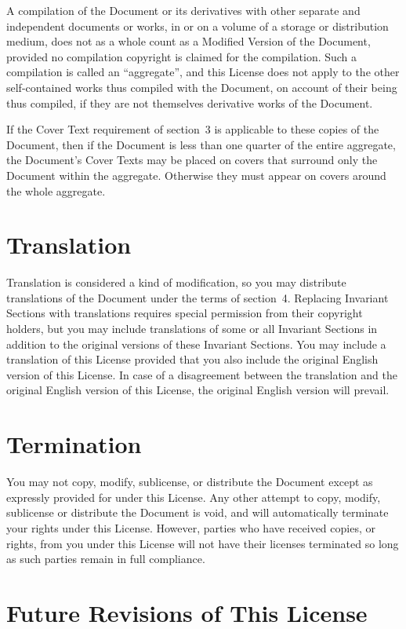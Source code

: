 A compilation of the Document or its derivatives with other separate
and independent documents or works, in or on a volume of a storage or
distribution medium, does not as a whole count as a Modified Version
of the Document, provided no compilation copyright is claimed for the
compilation.  Such a compilation is called an ``aggregate'', and this
License does not apply to the other self-contained works thus compiled
with the Document, on account of their being thus compiled, if they
are not themselves derivative works of the Document.

If the Cover Text requirement of section~3 is applicable to these
copies of the Document, then if the Document is less than one quarter
of the entire aggregate, the Document's Cover Texts may be placed on
covers that surround only the Document within the aggregate.
Otherwise they must appear on covers around the whole aggregate.


\section{Translation}

Translation is considered a kind of modification, so you may
distribute translations of the Document under the terms of section~4.
Replacing Invariant Sections with translations requires special
permission from their copyright holders, but you may include
translations of some or all Invariant Sections in addition to the
original versions of these Invariant Sections.  You may include a
translation of this License provided that you also include the
original English version of this License.  In case of a disagreement
between the translation and the original English version of this
License, the original English version will prevail.


\section{Termination}

You may not copy, modify, sublicense, or distribute the Document except
as expressly provided for under this License.  Any other attempt to
copy, modify, sublicense or distribute the Document is void, and will
automatically terminate your rights under this License.  However,
parties who have received copies, or rights, from you under this
License will not have their licenses terminated so long as such
parties remain in full compliance.


\section{Future Revisions of This License}

